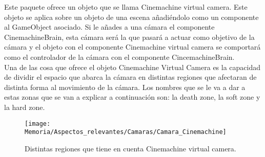 Este paquete ofrece un objeto que se llama Cinemachine virtual camera. Este objeto se aplica sobre un objeto de una escena añadiéndolo como un componente al GameObject asociado. Si le añades a una cámara el componente CinemachineBrain, esta cámara será la que pasará a actuar como objetivo de la cámara y el objeto con el componente Cinemachine virtual camera se comportará como el controlador de la cámara con el componente CincemachineBrain.\\
Una de las cosa que ofrece el objeto Cinemachine Virtual Camera es la capacidad de dividir el espacio que abarca la cámara en distintas regiones que afectaran de distinta forma al movimiento de la cámara. Los nombres que se le va a dar a estas zonas que se van a explicar a continuación son: la death zone, la soft zone y la hard zone. 

\clearpage
\begin{figure}[h]
\texttt{[image: Memoria/Aspectos\_relevantes/Camaras/Camara\_Cinemachine]}
\caption{Distintas regiones que tiene en cuenta Cinemachine virtual camera.}
\end{figure}


